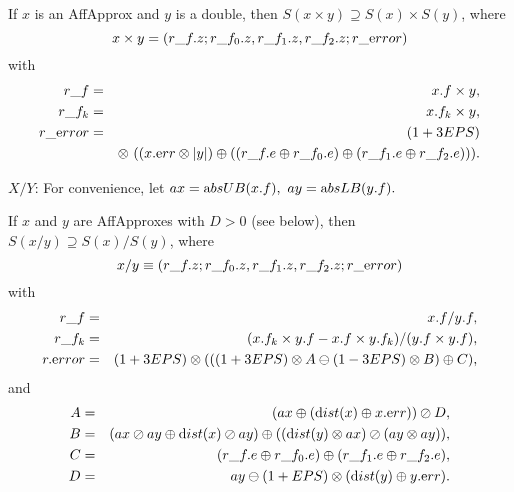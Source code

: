 \begin{proposition}\label{GMT prop8.7} \hskip-4pt If $x$ is an 
AffApprox  and $y$ is a double{\textrm ,} 
then $S(x \times y) \supseteq S(x) \times S(y)${\textrm ,} where
$$x \times y = (r\_f.z; r\_f_0.z, r\_f_1.z, r\_f_2.z; r\_{\textrm error})$$
with
\begin{eqnarray*}
r\_f& =& x.f \times y,\\
r\_f_k &=& x.f_k \times y,\\
r\_{\textrm error} &=& (1+3EPS)\\
&& \otimes\ ( (x.{\textrm err} \otimes |y|) \oplus
( (r\_f.e \oplus r\_f_0.e) \oplus (r\_f_1.e \oplus r\_f_2.e)) ).
\end{eqnarray*}
\end{proposition}

$X/Y$: 
For convenience, let  $ax = {\textrm absUB}(x.f),\ ay = {\textrm absLB}(y.f).$ 
 
\begin{proposition}\label{GMT prop8.8} If $x$ and $y$ are 
{\textrm AffApproxes}  with $D > 0$ {\textrm (}\/see below{\textrm ),} then
$S(x / y) \supseteq S(x) / S(y)${\textrm ,} where
$$x / y \equiv (r\_f.z; r\_f_0.z, r\_f_1.z, r\_f_2.z; r\_{\textrm error})$$
with
\begin{eqnarray*}
r\_f &=& x.f / y.f,
\\
r\_f_k& =& (x.f_k \times y.f - x.f \times y.f_k)/ (y.f \times y.f),\\
r.{\textrm error} & =& (1 + 3EPS) \otimes (
((1 + 3EPS) \otimes A \ominus (1 - 3EPS) \otimes B )\oplus C ),\end{eqnarray*}
and
\begin{eqnarray*}
A &=& (ax \oplus ({\textrm dist}(x) \oplus x.{\textrm err})) \oslash D,\\
B &=& (ax \oslash ay \oplus {\textrm dist}(x) \oslash ay)
\oplus  (({\textrm dist}(y) \otimes ax) \oslash (ay \otimes ay)),\\
C &=& (r\_f.e \oplus r\_f_0.e) \oplus (r\_f_1.e \oplus
r\_f_2.e),\\
D &=& ay \ominus (1 + EPS) \otimes ({\textrm dist}(y) \oplus y.{\textrm err}).
\end{eqnarray*}
\end{proposition}


